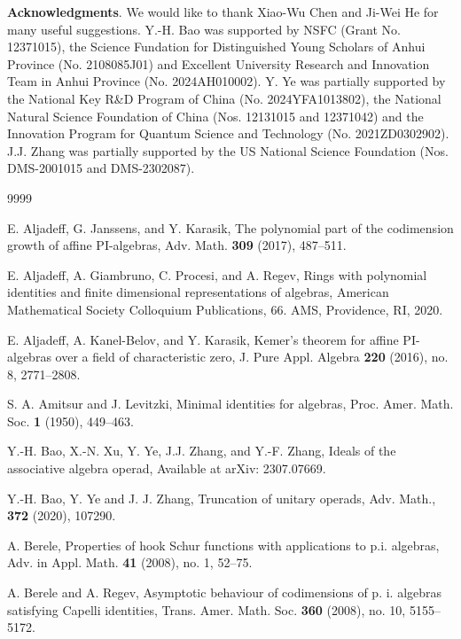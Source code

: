 \documentclass{amsart}
\theoremstyle{definition}
\theoremstyle{remark}
\numberwithin{equation}{section}
\begin{document}
\noindent\textbf{Acknowledgments}.
We would like to thank Xiao-Wu Chen and Ji-Wei He for many 
useful suggestions. Y.-H. Bao was supported by NSFC (Grant
No. 12371015),  the Science Fundation for Distinguished 
Young Scholars of Anhui Province (No. 2108085J01) and 
Excellent University Research and Innovation Team in 
Anhui Province (No. 2024AH010002). Y. Ye was partially 
supported by the National Key R\&D Program
of China (No. 2024YFA1013802), the National Natural Science Foundation of 
China (Nos. 12131015 and 12371042) 
and the Innovation Program for Quantum Science and 
Technology (No. 2021ZD0302902). 
J.J. Zhang was partially supported by the US National
Science Foundation (Nos. DMS-2001015 and DMS-2302087).



\begin{thebibliography}{9999}



E. Aljadeff, G. Janssens, and Y. Karasik, 
The polynomial part of the codimension growth of affine PI-algebras,
Adv. Math. {\bf 309} (2017), 487--511. 


E. Aljadeff, A. Giambruno, C. Procesi, and A. Regev, 
Rings with polynomial identities and finite dimensional representations 
of algebras, 
American Mathematical Society Colloquium Publications, 66. 
AMS, Providence, RI, 2020. 


E. Aljadeff, A. Kanel-Belov, and Y. Karasik, 
Kemer's theorem for affine PI-algebras over a field of 
characteristic zero, 
J. Pure Appl. Algebra {\bf 220} (2016), no. 8, 2771--2808. 
	
S. A. Amitsur and J. Levitzki, 
Minimal identities for algebras, 
Proc. Amer. Math. Soc.	\textbf{1} (1950), 449--463.

Y.-H. Bao, X.-N. Xu, Y. Ye, J.J. Zhang, and Y.-F. Zhang,
Ideals of the associative algebra operad, Available at arXiv: 2307.07669.

Y.-H. Bao, Y. Ye and J. J. Zhang, 
Truncation of unitary operads, Adv. Math., {\bf 372} (2020), 107290.

A. Berele, 
Properties of hook Schur functions with applications to p.i. algebras,
Adv. in Appl. Math. {\bf 41} (2008), no. 1, 52--75. 
	
A. Berele and A. Regev, 
Asymptotic behaviour of codimensions of p. i. algebras satisfying 
Capelli identities,
Trans. Amer. Math. Soc. {\bf 360} (2008), no. 10, 5155--5172.


\end{thebibliography}
\end{document}
